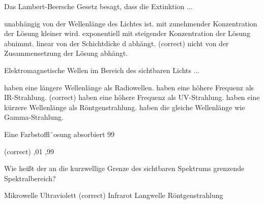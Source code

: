 \documentclass[11pt]{exam}
\begin{document}
\setlength{\voffset}{-0.5in}
\setlength{\headsep}{5pt}

\hspace{2mm}
 \hspace{5mm}
\vspace{4mm}

\begin{questions}

\question Das Lambert-Beersche Gesetz besagt, dass die Extinktion ...

\begin{choices}
	\choice unabhängig von der Wellenlänge des Lichtes ist.
	\choice mit zunehmender Konzentration der Lösung kleiner wird.
	\choice exponentiell mit steigender Konzentration der Lösung abnimmt.
	\choice linear von der Schichtdicke d abhängt. (correct)
	\choice nicht von der Zusammensetzung der Lösung abhängt.
\end{choices}

\vspace{3mm}\question Elektromagnetische Wellen im Bereich des sichtbaren Lichts ...

\begin{choices}
	\choice haben eine längere Wellenlänge als Radiowellen.
	\choice haben eine höhere Frequenz als IR-Strahlung. (correct)
	\choice haben eine höhere Frequenz als UV-Strahlung.
	\choice haben eine kürzere Wellenlänge als Röntgenstrahlung.
	\choice haben die gleiche Wellenlänge wie Gamma-Strahlung.
\end{choices}

\vspace{3mm}\question Eine Farbstoffl¨osung absorbiert 99 %

\begin{choices}
	 (correct)
	,01
	,99
\end{choices}

\vspace{3mm}\question Wie heißt der an die kurzwellige Grenze des sichtbaren Spektrums grenzende Spektralbereich?

\begin{choices}
	\choice Mikrowelle
	\choice Ultraviolett (correct)
	\choice Infrarot
	\choice Langwelle
	\choice Röntgenstrahlung
\end{choices}


\end{questions}
\end{document}
